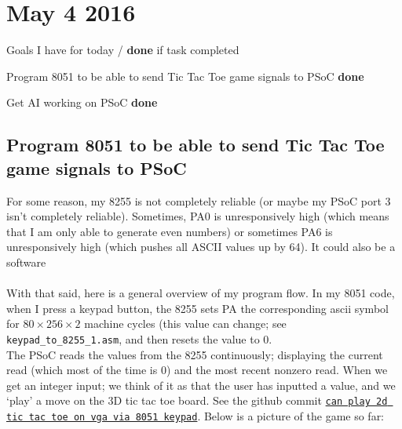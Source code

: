 \documentclass[12pt,twoside]{article}
\newenvironment{tight_itemize}{
\begin{itemize}
  \setlength{\itemsep}{0pt}
  \setlength{\parskip}{0pt}
}{\end{itemize}}
\begin{document}

\newpage
\section{May 4 2016}

Goals I have for today / {\bf done} if task completed
\begin{tight_itemize}
\item Program 8051 to be able to send Tic Tac Toe game signals to PSoC {\bf done}
\item Get AI working on PSoC {\bf done}
\end{tight_itemize}

\subsection{Program 8051 to be able to send Tic Tac Toe game signals to PSoC}
For some reason, my 8255 is not completely reliable (or maybe my PSoC port 3 isn't completely reliable). Sometimes, PA0 is unresponsively high (which means that I am only able to generate even numbers) or sometimes PA6 is unresponsively high (which pushes all ASCII values up by 64). It could also be a software 
\\ 
\\ With that said, here is a general overview of my program flow. In my 8051 code, when I press a keypad button, the 8255 sets PA the corresponding ascii symbol for $80\times256\times2$ machine cycles (this value can change; see \texttt{keypad\_to\_8255\_1.asm}, and then resets the value to 0. 
\\ The PSoC reads the values from the 8255 continuously; displaying the current read (which most of the time is 0) and the most recent nonzero read. When we get an integer input; we think of it as that the user has inputted a value, and we `play' a move on the 3D tic tac toe board. See the github commit \href{https://github.com/qandrew/6.115-final-project/commit/6c326fa8a2db2a654800f6be3b9bfd5749913904}{\texttt{can play 2d tic tac toe on vga via 8051 keypad}}. Below is a picture of the game so far: 
\end{document}
